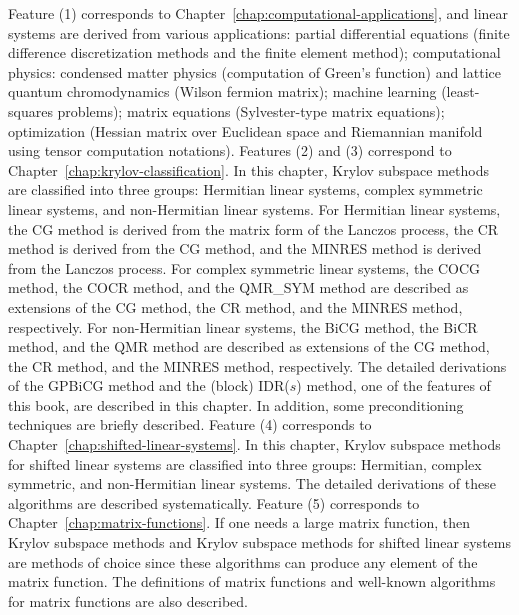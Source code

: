 {Feature (1) corresponds to Chapter~\ref{chap:computational-applications}, and linear systems are derived from various applications: partial differential equations (finite difference discretization methods and the finite element method); computational physics: condensed matter physics (computation of Green's function) and lattice quantum chromodynamics (Wilson fermion matrix); machine learning (least-squares problems); matrix equations (Sylvester-type matrix equations); optimization (Hessian matrix over Euclidean space and Riemannian manifold using tensor computation notations).}
{Features (2) and (3) correspond to Chapter~\ref{chap:krylov-classification}. In this chapter, Krylov subspace methods are classified into three groups: Hermitian linear systems, complex symmetric linear systems, and non-Hermitian linear systems. For Hermitian linear systems, the CG method is derived from the matrix form of the Lanczos process, the CR method is derived from the CG method, and the MINRES method is derived from the Lanczos process. For complex symmetric linear systems, the COCG method, the COCR method, and the QMR\_SYM method are described as extensions of the CG method, the CR method, and the MINRES method, respectively. For non-Hermitian linear systems, the BiCG method, the BiCR method, and the QMR method are described as extensions of the CG method, the CR method, and the MINRES method, respectively. The detailed derivations of the GPBiCG method and the (block) IDR($s$) method, one of the features of this book, are described in this chapter. In addition, some preconditioning techniques are briefly described.}
{Feature (4) corresponds to Chapter~\ref{chap:shifted-linear-systems}. In this chapter, Krylov subspace methods for shifted linear systems are classified into three groups: Hermitian, complex symmetric, and non-Hermitian linear systems. The detailed derivations of these algorithms are described systematically.}
{Feature (5) corresponds to Chapter~\ref{chap:matrix-functions}. If one needs a large matrix function, then Krylov subspace methods and Krylov subspace methods for shifted linear systems are methods of choice since these algorithms can produce any element of the matrix function. The definitions of matrix functions and well-known algorithms for matrix functions are also described.}
